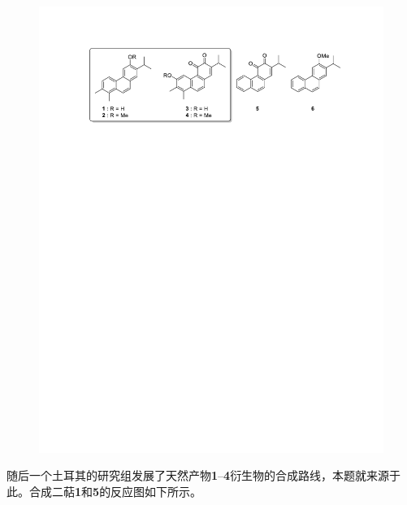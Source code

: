 \begin{figure}[h]
	\centering
	\includegraphics[width=14cm]{./pic/t1-2.pdf}
\end{figure}

随后一个土耳其的研究组发展了天然产物\textbf{1}--\textbf{4}衍生物的合成路线，本题就来源于此。合成二萜\textbf{1}和\textbf{5}的反应图如下所示。

